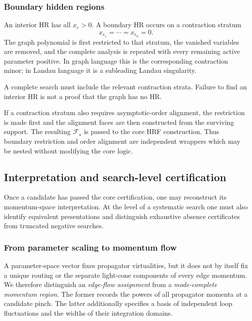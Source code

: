 \documentclass[a4paper,11pt]{article}
\begin{document}
\subsubsection{Boundary hidden regions}
\label{sec:boundary}

An interior HR has all \(x_e>0\).  A boundary HR occurs on a contraction
stratum
\begin{equation}
 x_{e_1}=\cdots=x_{e_k}=0.
\end{equation}
The graph polynomial is first restricted to that stratum, the vanished
variables are removed, and the complete analysis is repeated with every
remaining active parameter positive.  In graph language this is the
corresponding contraction minor; in Landau language it is a subleading
Landau singularity.

A complete search must include the relevant contraction strata.  Failure to
find an interior HR is not a proof that the graph has no HR.

If a contraction stratum also requires asymptotic-order alignment, the
restriction is made first and the alignment faces are then constructed from
the surviving support.  The resulting \(\mathcal F_\star\) is passed to the
core HRF construction.  Thus boundary restriction and order alignment are
independent wrappers which may be nested without modifying the core logic.

\subsection{Interpretation and search-level certification}

Once a candidate has passed the core certification, one may reconstruct its
momentum-space interpretation.  At the level of a systematic search one
must also identify equivalent presentations and distinguish exhaustive
absence certificates from truncated negative searches.

\subsubsection{From parameter scaling to momentum flow}
\label{sec:momentum-reconstruction}

A parameter-space vector fixes propagator virtualities, but it does not by
itself fix a unique routing or the separate light-cone components of every
edge momentum.  We therefore distinguish an \emph{edge-flow assignment}
from a \emph{mode-complete momentum region}.  The former records the powers
of all propagator momenta at a candidate pinch.  The latter additionally
specifies a basis of independent loop fluctuations and the widths of their
integration domains.
\end{document}
